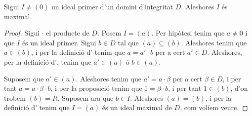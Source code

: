 \documentclass[../../Main.tex]{subfiles}
\begin{document}
	\begin{proposition}
		\label{prop:ideal primer en DI es maximal}
		Sigui \(I\neq(0)\) un ideal primer d'un domini d'integritat \(D\). Aleshores \(I\) és maximal.
		\begin{proof}
			Sigui \(\cdot\) el producte de \(D\). Posem \(I=(a)\). Per hipòtesi tenim que \(a\neq0\) i que \(I\) és un ideal primer. Sigui \(b\in D\) tal que \((a)\subseteq(b)\). Aleshores tenim que \(a\in(b)\), i per la definició d' tenim que \(a=a'\cdot b\) per a cert \(a'\in D\). Aleshores, per la definició d', tenim que \(a'\in(a)\) ó \(b\in(a)\).
			
			Suposem que \(a'\in(a)\). Aleshores tenim que \(a'=a\cdot\beta\) per a cert \(\beta\in D\), i per tant \(a=a\cdot\beta\cdot b\), i per la proposició  tenim que \(1=\beta\cdot b\), i per tant \(1\in(b)\), d'on trobem \((b)=R\). Suposem ara que \(b\in I\). Aleshores \((a)=(b)\), i per la definició d' tenim que \(I=(a)\) és un ideal maximal de \(D\), com volíem veure.
		\end{proof}
	\end{proposition}
\end{document}
